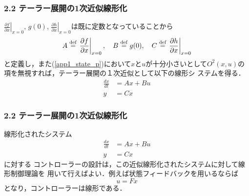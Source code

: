 \begin{frame}[t]
\frametitle{2.2 テーラー展開の1次近似線形化}
$\left. \frac{\partial f}{\partial x} \right \vert _{x=0}$, $
g(0)$, $\left. \frac{\partial h}{\partial x} \right \vert _{x=0}$は既に定数となっていることから
\begin{equation}
 A \stackrel{\rm def}{=} \left.\frac{\partial f}{\partial x} \right \vert _{x=0},
  \quad	B \stackrel{\rm def}{=} g(0),
  \quad	C \stackrel{\rm def}{=} \left. \frac{\partial h}{\partial x} \right \vert _{x=0}
\end{equation}
と定義し，また(\ref{app1_state_p})において$x$と$u$が十分小さいとして$
O^2(x, u)$の項を無視すれば，テーラー展開の１次近似として以下の線形シ
ステムを得る．
\begin{align}
 \frac{dx}{dt} &= A x + B u
  \label{first_approx}
\\
 y&= C x
\end{align}
\end{frame}

\begin{frame}[t]
\frametitle{2.2 テーラー展開の1次近似線形化}
\addtocounter{equation}{-2}
線形化されたシステム
\begin{align}
 \frac{dx}{dt} &= A x + B u
\\
 y&= C x
\end{align}
に対する
コントローラーの設計は，この近似線形化されたシステムに対して線形制御理論を
用いて行えばよい．例えば状態フィードバックを用いるならば
\begin{equation}
 u = Fx
\end{equation}
となり，コントローラーは線形である．

\end{frame}

